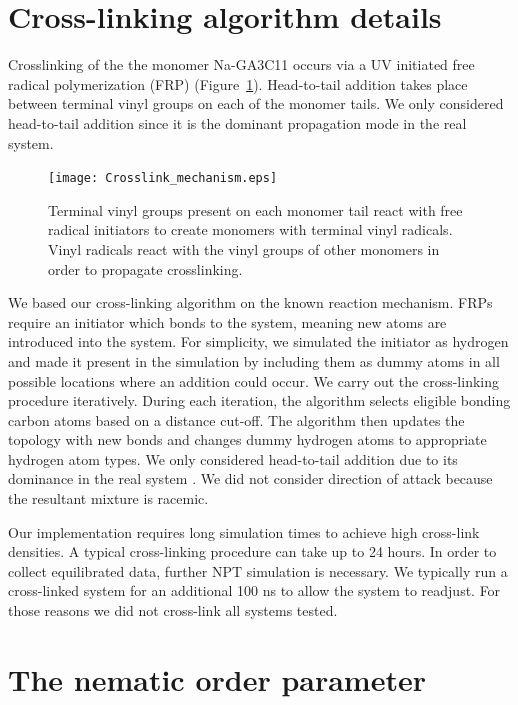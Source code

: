 \documentclass{article}
\begin{document}
  \section{Cross-linking algorithm details}\label{section:xlink}

  Crosslinking of the the monomer Na-GA3C11 occurs via a UV initiated free
  radical polymerization (FRP) (Figure~\ref{fig:xlink_mech}). Head-to-tail addition
  takes place between terminal vinyl groups on each of the monomer tails. We
  only considered head-to-tail addition since it is the dominant propagation mode
  in the real system.   

  \begin{figure}[!htb]
  \centering
  \texttt{[image: Crosslink\_mechanism.eps]}
  \caption{Terminal vinyl groups present on each monomer tail react with free
	  radical initiators to create monomers with terminal vinyl radicals.  Vinyl
	  radicals react with the vinyl groups of other monomers in order to propagate
	  crosslinking.}\label{fig:xlink_mech}
  \end{figure}
  
  We based our cross-linking algorithm on the known reaction mechanism.
  FRPs require an initiator which bonds to the system, meaning new atoms are
  introduced into the system. For simplicity, we simulated the initiator as
  hydrogen and made it present in the simulation by including them as dummy atoms
  in all possible locations where an addition could occur. We carry out the
  cross-linking procedure iteratively. During each iteration, the algorithm
  selects eligible bonding carbon atoms based on a distance cut-off. The algorithm
  then updates the topology with new bonds and changes dummy hydrogen atoms to appropriate
  hydrogen atom types. We only considered head-to-tail addition
  due to its dominance in the real system \cite{young_introduction_2011}. We did
  not consider direction of attack because the resultant mixture is racemic.

  Our implementation requires long simulation times to achieve high cross-link 
  densities. A typical cross-linking procedure can take up to 24 hours. In
  order to collect equilibrated data, further NPT simulation is necessary. We
  typically run a cross-linked system for an additional 100 ns to allow the system
  to readjust. For those reasons we did not cross-link all systems tested.
  
  \clearpage
  \section{The nematic order parameter}\label{method:nematic_order}
\end{document}
